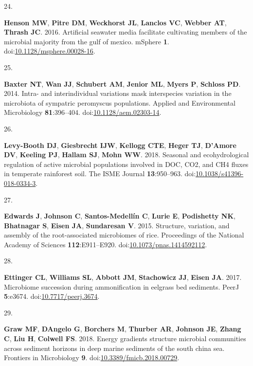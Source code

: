 \documentclass[
]{article}
\newlength{\cslhangindent}
\newlength{\csllabelwidth}
\newlength{\cslentryspacingunit} %
\newenvironment{CSLReferences}[2] %
 {%
  \setlength{\parindent}{0pt}
  \ifodd #1
  \let\oldpar\par
  \def\par{\hangindent=\cslhangindent\oldpar}
  \fi
  \setlength{\parskip}{#2\cslentryspacingunit}
 }%
 {}
\newcommand{\CSLLeftMargin}[1]{\parbox[t]{\csllabelwidth}{#1}}
\newcommand{\CSLRightInline}[1]{\parbox[t]{\linewidth - \csllabelwidth}{#1}\break}
\begin{document}
\begin{CSLReferences}{0}{1}
\leavevmode{}%
\CSLLeftMargin{24. }%
\CSLRightInline{\textbf{Henson MW}, \textbf{Pitre DM}, \textbf{Weckhorst
JL}, \textbf{Lanclos VC}, \textbf{Webber AT}, \textbf{Thrash JC}. 2016.
Artificial seawater media facilitate cultivating members of the
microbial majority from the gulf of mexico. {mSphere} \textbf{1}.
doi:\href{https://doi.org/10.1128/msphere.00028-16}{10.1128/msphere.00028-16}.}

\leavevmode{}%
\CSLLeftMargin{25. }%
\CSLRightInline{\textbf{Baxter NT}, \textbf{Wan JJ}, \textbf{Schubert
AM}, \textbf{Jenior ML}, \textbf{Myers P}, \textbf{Schloss PD}. 2014.
Intra- and interindividual variations mask interspecies variation in the
microbiota of sympatric peromyscus populations. Applied and
Environmental Microbiology \textbf{81}:396--404.
doi:\href{https://doi.org/10.1128/aem.02303-14}{10.1128/aem.02303-14}.}

\leavevmode{}%
\CSLLeftMargin{26. }%
\CSLRightInline{\textbf{Levy-Booth DJ}, \textbf{Giesbrecht IJW},
\textbf{Kellogg CTE}, \textbf{Heger TJ}, \textbf{D'Amore DV},
\textbf{Keeling PJ}, \textbf{Hallam SJ}, \textbf{Mohn WW}. 2018.
Seasonal and ecohydrological regulation of active microbial populations
involved in {DOC}, {CO}2, and {CH}4 fluxes in temperate rainforest soil.
The {ISME} Journal \textbf{13}:950--963.
doi:\href{https://doi.org/10.1038/s41396-018-0334-3}{10.1038/s41396-018-0334-3}.}

\leavevmode{}%
\CSLLeftMargin{27. }%
\CSLRightInline{\textbf{Edwards J}, \textbf{Johnson C},
\textbf{Santos-Medellín C}, \textbf{Lurie E}, \textbf{Podishetty NK},
\textbf{Bhatnagar S}, \textbf{Eisen JA}, \textbf{Sundaresan V}. 2015.
Structure, variation, and assembly of the root-associated microbiomes of
rice. Proceedings of the National Academy of Sciences
\textbf{112}:E911--E920.
doi:\href{https://doi.org/10.1073/pnas.1414592112}{10.1073/pnas.1414592112}.}

\leavevmode{}%
\CSLLeftMargin{28. }%
\CSLRightInline{\textbf{Ettinger CL}, \textbf{Williams SL},
\textbf{Abbott JM}, \textbf{Stachowicz JJ}, \textbf{Eisen JA}. 2017.
Microbiome succession during ammonification in eelgrass bed sediments.
{PeerJ} \textbf{5}:e3674.
doi:\href{https://doi.org/10.7717/peerj.3674}{10.7717/peerj.3674}.}

\leavevmode{}%
\CSLLeftMargin{29. }%
\CSLRightInline{\textbf{Graw MF}, \textbf{DAngelo G}, \textbf{Borchers
M}, \textbf{Thurber AR}, \textbf{Johnson JE}, \textbf{Zhang C},
\textbf{Liu H}, \textbf{Colwell FS}. 2018. Energy gradients structure
microbial communities across sediment horizons in deep marine sediments
of the south china sea. Frontiers in Microbiology \textbf{9}.
doi:\href{https://doi.org/10.3389/fmicb.2018.00729}{10.3389/fmicb.2018.00729}.}


\end{CSLReferences}
\end{document}
